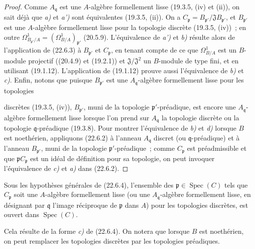 \begin{proof}
Comme $A_{\mathfrak q}$ est une $A$-algèbre formellement lisse (19.3.5, (iv)
et (ii)), on sait déjà que \emph{a)} et \emph{a')} sont équivalentes (19.3.5, (ii)). On a
$C_{\mathfrak p}=B_{\mathfrak p'}/\mathfrak J B_{\mathfrak p'}$, et
$B_{\mathfrak p'}$ est une $A$-algèbre formellement lisse pour la topologie
discrète (19.3.5, (iv))~; en outre
$\Omega^1_{B_{\mathfrak p'}/A}=(\Omega^1_{B/A})_{\mathfrak p'}$ (20.5.9).
L'équivalence de \emph{a')} et \emph{b)} résulte alors de l'application de (22.6.3) à
$B_{\mathfrak p'}$ et $C_{\mathfrak p}$, en tenant compte de ce que
$\Omega^1_{B/A}$ est un $B$-module projectif ((20.4.9) et (19.2.1)) et
$\mathfrak J/\mathfrak J^2$ un $B$-module de type fini, et en utilisant
(19.1.12). L'application de (19.1.12) prouve aussi l'équivalence de \emph{b)} et \emph{c)}.
Enfin, notons que puisque $B_{\mathfrak p'}$ est une
$A_{\mathfrak q}$-algèbre formellement lisse pour les topologies


discrètes (19.3.5, (iv)), $B_{\mathfrak p'}$, muni de la topologie
$\mathfrak p'$-préadique, est encore une $A_{\mathfrak q}$-algèbre
formellement lisse lorsque l'on prend sur $A_{\mathfrak q}$ la topologie
discrète ou la topologie $\mathfrak q$-préadique (19.3.8). Pour montrer
l'équivalence de \emph{b)} et \emph{d)} lorsque $B$ est noethérien, appliquons (22.6.2) à
l'anneau $A_{\mathfrak q}$ discret (ou $\mathfrak q$-préadique) et à l'anneau
$B_{\mathfrak p'}$, muni de la topologie $\mathfrak p'$-préadique~; comme
$C_{\mathfrak p}$ est préadmissible et que $\mathfrak pC_{\mathfrak p}$ est
un idéal de définition pour sa topologie, on peut invoquer l'équivalence de
\emph{c)} et \emph{a)} dans (22.6.2).
\end{proof}

\begin{corollary}[22.6.5]
\label{0.22.6.5-fr}
Sous les hypothèses générales de \textup{(22.6.4)}, l'ensemble des
$\mathfrak p\in\operatorname{Spec}(C)$ tels que $C_{\mathfrak p}$ soit une $A$-algèbre
formellement lisse \textup{(ou une $A_{\mathfrak q}$-algèbre formellement lisse, en
désignant par $\mathfrak q$ l'image réciproque de $\mathfrak p$ dans $A$)}
pour les topologies discrètes, est ouvert dans $\operatorname{Spec}(C)$.
\end{corollary}

Cela résulte de la forme \emph{c)} de (22.6.4). On notera que lorsque $B$ est
noethérien, on peut remplacer les topologies discrètes par les topologies
préadiques.

